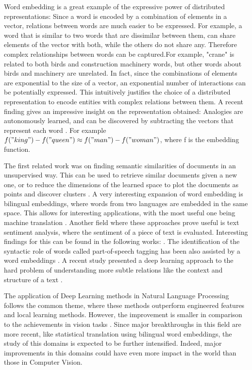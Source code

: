 \documentclass[a4paper]{article}
\begin{document}
		Word embedding is a great example of the expressive power of distributed representations\cite{Collobert 2008}: Since a word is encoded by a combination of elements in a vector, relations between words are much easier to be expressed. For example, a word that is similar to two words that are dissimilar between them, can share elements of the vector with both, while the others do not share any.   Therefore complex relationships between words can be captured.For example, "crane" is related to both birds and construction machinery words, but other words about birds and machinery are unrelated. In fact, since the combinations of elements are exponential to the size of a vector, an exponential number of interactions can be potentially expressed. This intuitively justifies the choice of a distributed representation to encode entities with complex relations between them.
		A recent finding gives an impressive insight on the representation obtained: Analogies are autonomously learned, and can be discovered by subtracting the vectors that represent each word \cite{Mikolov2013}. For example $f("king")-f("queen") \approx f("man")-f("woman") $, where f is the embedding function.
		
		The first related work was on finding semantic similarities of documents in an unsupervised way. This can be used to retrieve similar documents given a new one, or to reduce the dimensions of the learned space to plot the documents as points and discover clusters \cite{Hinton2006,Salakhutdinov2009a}. A very interesting expansion of word embedding is bilingual embeddings, where words from two languages are embedded in the same space. This allows for interesting applications, with the most useful one being machine translation \cite{Devlin2014}. Another field where these approaches prove useful is text sentiment analysis, where the sentiment of a piece of text is evaluated. Interesting findings for this can be found in the following works: \cite{Le2014,Socher2011}. The identification of the syntactic role of words  called part-of-speech tagging has been also assisted by a word embeddings \cite{Santos2014}. A recent study presented a deep learning approach to the hard problem of understanding more subtle relations like the context and structure of a text \cite{Ji2014}. 
		
		The application of Deep Learning methods in Natural Language Processing follows the common theme, where these methods outperform engineered features and local learning methods. However, the improvement is smaller in comparison to the achievements in vision tasks \cite{Deng2014}. Since major breakthroughs in this field are more recent, like statistical translation using bilingual word embeddings, the study of this domains is expected to be further intensified. Indeed, major improvements in this domains could have even more impact in the world than those in Computer Vision.
		
\end{document}
